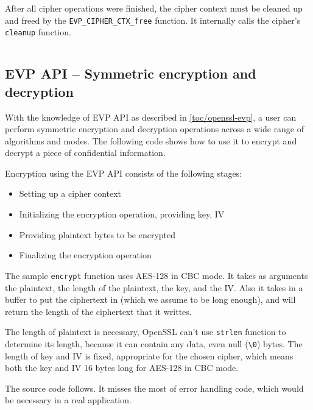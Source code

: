 \inputminted{c}{code/openssl-evp-cipherfinal.c}

After all cipher operations were finished, the cipher context must be cleaned up and freed by the \texttt{EVP\_CIPHER\_CTX\_free} function. It internally calls the cipher's \texttt{cleanup} function.

\inputminted{c}{code/openssl-evp-cipher-ctx-free.c}


\subsection{EVP API -- Symmetric encryption and decryption}
\label{toc/openssl-evp-encryption}

With the knowledge of EVP API as described in \autoref{toc/openssl-evp}, a user can perform symmetric encryption and decryption operations across a wide range of algorithms and modes. The following code shows how to use it to encrypt and decrypt a piece of confidential information.

Encryption using the EVP API consists of the following stages:

\begin{itemize}
  \item Setting up a cipher context
  \item Initializing the encryption operation, providing key, IV
  \item Providing plaintext bytes to be encrypted
  \item Finalizing the encryption operation
\end{itemize}

The sample \texttt{encrypt} function uses AES-128 in CBC mode. It takes as arguments the plaintext, the length of the plaintext, the key, and the IV. Also it takes in a buffer to put the ciphertext in (which we assume to be long enough), and will return the length of the ciphertext that it writtes.

The length of plaintext is necessary, OpenSSL can't use \texttt{strlen} function to determine its length, because it can contain any data, even null (\texttt{\textbackslash0}) bytes. The length of key and IV is fixed, appropriate for the chosen cipher, which means both the key and IV 16 bytes long for AES-128 in CBC mode.

The source code follows. It misses the most of error handling code, which would be necessary in a real application.

\inputminted{c}{code/openssl-evp-encrypt.c}

